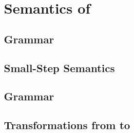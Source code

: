 \onecolumn
\appendix
\section{Semantics of \constc}
\label{sec:ottsemantics}

\subsection{\ccore Grammar}

\newpage
\subsection{\ccore Small-Step Semantics}
\ottdefnsJop

\newpage
\subsection{\constc Grammar}

\newpage
\subsection{Transformations from \constc to \ccore}
\ottdefnsJoptrans
\ottdefnsJtrans
